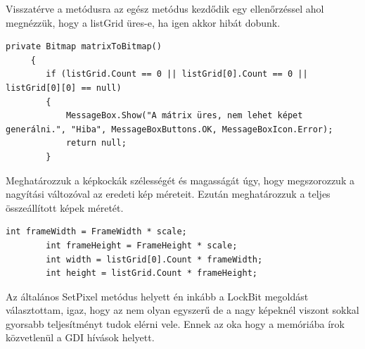 \documentclass[]{thesis-ekf}
\theoremstyle{definition}
\theoremstyle{remark}
\begin{document}
Visszatérve a metódusra az egész metódus kezdődik egy ellenőrzéssel ahol megnézzük, hogy a listGrid üres-e, ha igen akkor hibát dobunk.
\begin{lstlisting}[language=CSharp]
	  private Bitmap matrixToBitmap()
	 {
	 	if (listGrid.Count == 0 || listGrid[0].Count == 0 || listGrid[0][0] == null)
	 	{
	 		MessageBox.Show("A mátrix üres, nem lehet képet generálni.", "Hiba", MessageBoxButtons.OK, MessageBoxIcon.Error);
	 		return null;
	 	}
\end{lstlisting}
Meghatározzuk a képkockák szélességét és magasságát úgy, hogy megszorozzuk a nagyítási változóval az eredeti kép méreteit. Ezután meghatározzuk a teljes összeállított képek méretét.
\begin{lstlisting}[language=CSharp]
	 	int frameWidth = FrameWidth * scale;
	 	int frameHeight = FrameHeight * scale;
	 	int width = listGrid[0].Count * frameWidth;
	 	int height = listGrid.Count * frameHeight;
\end{lstlisting}
Az általános SetPixel metódus helyett én inkább a LockBit megoldást választottam, igaz, hogy az nem olyan egyszerű de a nagy képeknél viszont sokkal gyorsabb teljesítményt tudok elérni vele. Ennek az oka hogy a memóriába írok közvetlenül a GDI hívások helyett.
\end{document}
